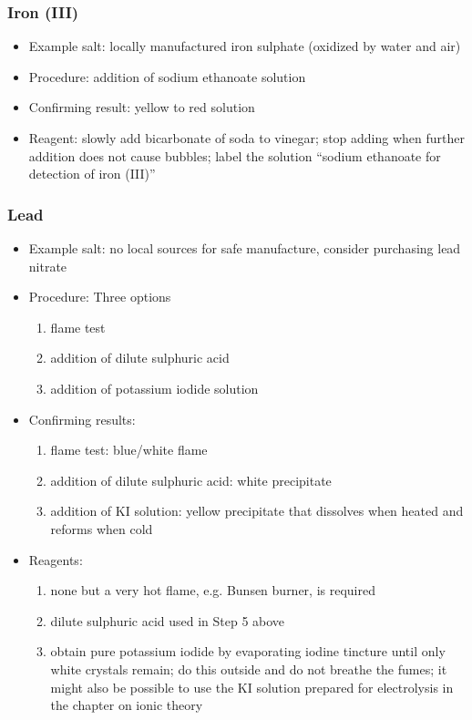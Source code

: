 \subsubsection{Iron (III)}
\begin{itemize}
\item{Example salt: locally manufactured iron sulphate 
(oxidized by water and air)}
\item{Procedure: addition of sodium ethanoate solution}
\item{Confirming result: yellow to red solution}
\item{Reagent: slowly add bicarbonate of soda to vinegar; stop adding when further addition does not cause bubbles; label the solution ``sodium ethanoate for detection of iron (III)''}
\end{itemize}

\subsubsection{Lead}
\begin{itemize}
\item{Example salt: no local sources for safe manufacture, consider purchasing lead nitrate}

\item{Procedure: Three options
\begin{enumerate}
\item{flame test} 
\item{addition of dilute sulphuric acid}
\item{addition of potassium iodide solution}
\end{enumerate}
} %

\item{Confirming results:
\begin{enumerate}
\item{flame test: blue/white flame}
\item{addition of dilute sulphuric acid: white precipitate}
\item{addition of KI solution: yellow precipitate that dissolves when heated and reforms when cold}
\end{enumerate}
} %

\item{Reagents:
\begin{enumerate}
\item{none but a very hot flame, e.g. Bunsen burner, is required} 
\item{dilute sulphuric acid used in Step 5 above}
\item{obtain pure potassium iodide by evaporating iodine tincture until only white crystals remain; do this outside and do not breathe the fumes; it might also be possible to use the KI solution prepared for electrolysis in the chapter on ionic theory}
\end{enumerate}
} %

\end{itemize} %

